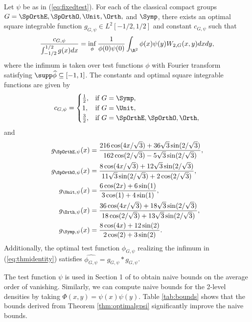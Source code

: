\begin{theorem}
	Let $\psi$ be as in (\ref{eq:fixedtest}). For each of the classical compact groups $G = \SpOrthE, \SpOrthO, \Unit, \Orth,$ and $\Symp$, there exists an optimal square integrable function $g_{G, \psi} \in L^2 [-1/2, 1/2]$ and constant $c_{G, \psi}$ such that 
		\begin{equation}
			\frac{c_{G, \psi}}{\int_{-1/2}^{1/2} g(x) dx} = \inf_\phi  \frac{1}{\phi(0) \psi(0)} \int_{\R^2} \phi(x) \psi(y) W_{2, G} (x, y) dx dy, \label{eq:thmidentity} 	
		\end{equation}	
	where the infimum is taken over test functions $\phi$ with Fourier transform satisfying $\supp \widehat \phi \subseteq [-1, 1]$. The constants and optimal square integrable functions are given by
		\begin{equation}
			c_{G, \psi} = 
				\begin{cases}
					\frac12, 		&\text{if } G = \Symp,\\
					1, 				&\text{if } G = \Unit, \\
					\frac32,			&\text{if } G = \SpOrthE, \SpOrthO, \Orth,
				\end{cases}
		\end{equation}
	and
		\begin{align}
			g_{\SpOrthE, \psi} (x) 
				&= \frac{216 \cos(4x/\sqrt 3) + 36 \sqrt 3 \sin(2/\sqrt 3)}{162 \cos(2/\sqrt 3) - 5 \sqrt{3} \sin(2/\sqrt 3)}, \\
			g_{\SpOrthO, \psi} (x) &= \frac{8 \cos (4 x/\sqrt{3})+12 \sqrt{3} \sin(2/\sqrt{3})}{11 \sqrt{3} \sin (2/\sqrt{3})+2 \cos(2/\sqrt{3})}, \\
			g_{\Unit, \psi} (x)
				&= \frac{6 \cos (2x) + 6 \sin(1)}{3 \cos(1) + 4 \sin(1)}, \\
			g_{\Orth, \psi} (x)
				&=  \frac{36\cos(4x/\sqrt{3})+18\sqrt{3} \sin(2/\sqrt{3})}{18 \cos(2/\sqrt{3}) + 13 \sqrt{3} \sin(2/\sqrt{3})}, \\
			g_{\Symp, \psi} (x)
				&= \frac{8 \cos (4x) + 12 \sin(2)}{2 \cos (2) + 3 \sin(2)}.
		\end{align}	
	Additionally, the optimal test function $\phi_{G, \psi}$ realizing the infimum in (\ref{eq:thmidentity}) satisfies $\widehat{\phi_{G, \psi}} = g_{G, \psi} * g_{G, \psi}$. 
		\label{thm:optimalgpsi}
\end{theorem}
The test function $\psi$ is used in Section 1 of \cite{ILS} to obtain naive bounds on the average order of vanishing. Similarly, we can compute naive bounds for the 2-level densities by taking $\Phi (x, y) = \psi(x) \psi(y)$. Table \ref{tab:bounds} shows that the bounds derived from Theorem \ref{thm:optimalgpsi} significantly improve the naive bounds. 


